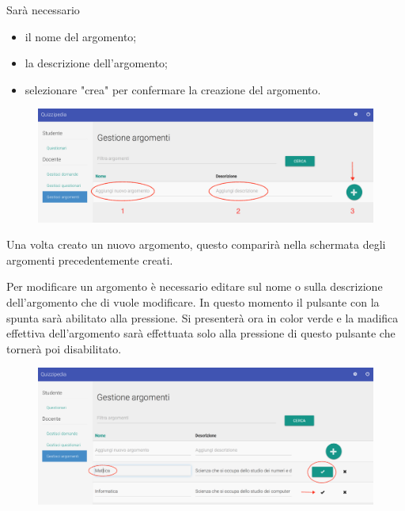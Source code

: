 \documentclass[12pt,a4paper]{article}
\begin{document}
		Sarà necessario 
			\begin{itemize}
			\item il nome del argomento;
			\item la descrizione dell'argomento;
			\item selezionare "crea" per confermare la creazione del argomento.
		\end{itemize}
		
			\begin{figure}[H]	
				\centering
				\includegraphics[width=1.0\linewidth]{../img/screenshot/aggiungiArgomento.png}
				\caption{}
				\label{Creazione argomento}
			\end{figure}
		
		Una volta creato un nuovo argomento, questo comparirà nella schermata degli argomenti precedentemente creati.
		
		Per modificare un argomento è necessario editare sul nome o sulla descrizione  dell'argomento che di vuole modificare. In questo momento il pulsante con la spunta sarà abilitato alla pressione. Si presenterà ora in color verde e la madifica effettiva dell'argomento sarà effettuata solo alla pressione di questo pulsante che tornerà poi disabilitato.
		
			\begin{figure}[H]	
				\centering
				\includegraphics[width=1.0\linewidth]{../img/screenshot/modificaArgomento.png}
				\caption{}
				\label{Modifica argomento}
			\end{figure}
		
\end{document}
